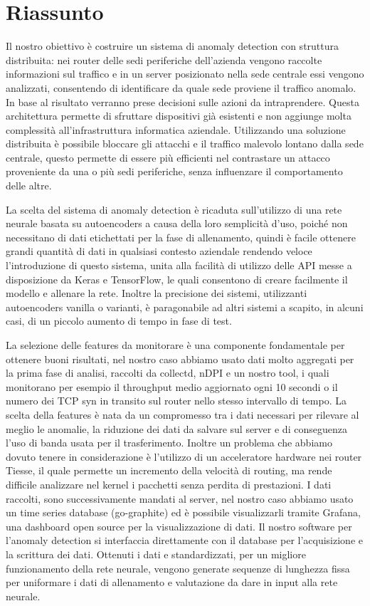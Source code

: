 \section{Riassunto}

Il nostro obiettivo è costruire un sistema di anomaly detection con struttura distribuita: nei router delle sedi periferiche dell'azienda vengono raccolte informazioni sul traffico e in un server posizionato nella sede centrale essi vengono analizzati, consentendo di identificare da quale sede proviene il traffico anomalo. In base al risultato verranno prese decisioni sulle azioni da intraprendere. Questa architettura permette di sfruttare dispositivi già esistenti e non aggiunge molta complessità all'infrastruttura informatica aziendale. Utilizzando una soluzione distribuita è possibile bloccare gli attacchi e il traffico malevolo lontano dalla sede centrale, questo permette di essere più efficienti nel contrastare un attacco proveniente da una o più sedi periferiche, senza influenzare il comportamento delle altre.

La scelta del sistema di anomaly detection è ricaduta sull'utilizzo di una rete neurale basata su autoencoders a causa della loro semplicità d'uso, poiché non necessitano di dati etichettati per la fase di allenamento, quindi è facile ottenere grandi quantità di dati in qualsiasi contesto aziendale rendendo veloce l'introduzione di questo sistema, unita alla facilità di utilizzo delle API messe a disposizione da Keras e TensorFlow, le quali consentono di creare facilmente il modello e allenare la rete. Inoltre la precisione dei sistemi, utilizzanti autoencoders vanilla o varianti, è paragonabile ad altri sistemi a scapito, in alcuni casi, di un piccolo aumento di tempo in fase di test.

La selezione delle features da monitorare è una componente fondamentale per ottenere buoni risultati, nel nostro caso abbiamo usato dati molto aggregati per la prima fase di analisi, raccolti da collectd, nDPI e un nostro tool, i quali monitorano per esempio il throughput medio aggiornato ogni 10 secondi o il numero dei TCP syn in transito sul router nello stesso intervallo di tempo. La scelta della features è nata da un compromesso tra i dati necessari per rilevare al meglio le anomalie, la riduzione dei dati da salvare sul server e di conseguenza l'uso di banda usata per il trasferimento. Inoltre un problema che abbiamo dovuto tenere in considerazione è l'utilizzo di un acceleratore hardware nei router Tiesse, il quale permette un incremento della velocità di routing, ma rende difficile analizzare nel kernel i pacchetti senza perdita di prestazioni. I dati raccolti, sono successivamente mandati al server, nel nostro caso abbiamo usato un time series database (go-graphite) ed è possibile visualizzarli tramite Grafana, una dashboard open source per la visualizzazione di dati. Il nostro software per l’anomaly detection si interfaccia direttamente con il database per l’acquisizione e la scrittura dei dati. Ottenuti i dati e standardizzati, per un migliore funzionamento della rete neurale, vengono generate sequenze di lunghezza fissa per uniformare i dati di allenamento e valutazione da dare in input alla rete neurale.

